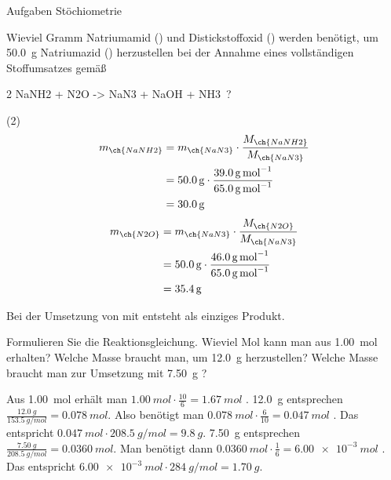 \documentclass[DIV11,bib=totoc]{scrartcl}
\begin{document}
\begin{center}
  \Huge\sffamily Aufgaben Stöchiometrie
\end{center}


\begin{question}
Wieviel Gramm Natriumamid () und Distickstoffoxid () werden
benötigt, um \SI{50.0}{g} Natriumazid () herzustellen bei der Annahme
eines vollständigen Stoffumsatzes gemäß
\begin{reaction*}
  2 NaNH2 + N2O -> NaN3 + NaOH + NH3 \,?
\end{reaction*}
\end{question}
\begin{solution}
\begin{tasks}[label=\empty](2)
  \task
  \begin{align*}
    m_{\ch{NaNH2}} &= m_{\ch{NaN3}} \cdot\frac{M_{\ch{NaNH2}}}{M_{\ch{NaN3}}} \\
      &= \SI{50.0}{g}\cdot\frac{\SI{39.0}{\gram\per\mole}}{\SI{65.0}{\gram\per\mole}} \\
      &= \SI{30.0}{g}
  \end{align*}
  \task
  \begin{align*}
    m_{\ch{N2O}} &= m_{\ch{NaN3}} \cdot\frac{M_{\ch{N2O}}}{M_{\ch{NaN3}}} \\
      &= \SI{50.0}{g}\cdot\frac{\SI{46.0}{\gram\per\mole}}{\SI{65.0}{\gram\per\mole}} \\
      &= \SI{35.4}{g}
  \end{align*}
\end{tasks}
\end{solution}

\begin{question}
Bei der Umsetzung von  mit  entsteht  als
einziges Produkt.
\begin{tasks}
  \task Formulieren Sie die Reaktionsgleichung.
  \task Wieviel Mol  kann man aus \SI{1.00}{mol}  erhalten?
  \task Welche Masse  braucht man, um \SI{12.0}{g} 
    herzustellen?
  \task Welche Masse  braucht man zur Umsetzung mit \SI{7.50}{g}
    ?
\end{tasks}
\end{question}
\begin{solution}
  \begin{tasks}
    \task {}
    \task Aus \SI{1.00}{mol}  erhält man
      $\SI{1.00}{mol}\cdot\frac{10}{6} = \SI{1.67}{mol}$ .
    \task \SI{12.0}{g}  entsprechen
      $\frac{\SI{12.0}{g}}{\SI{153.5}{g/mol}} = \SI{0.078}{mol}$.  Also
      benötigt man $\SI{0.078}{mol}\cdot\frac{6}{10}=\SI{0.047}{mol}$
      .  Das entspricht $\SI{0.047}{mol}\cdot\SI{208.5}{g/mol} =
      \SI{9.8}{g}$.
    \task \SI{7.50}{g}  entsprechen
      $\frac{\SI{7.50}{g}}{\SI{208.5}{g/mol}} = \SI{0.0360}{mol}$.  Man
      benötigt dann $\SI{0.0360}{mol}\cdot\frac{1}{6}=\SI{6.00e-3}{mol}$
      .  Das entspricht $\SI{6.00e-3}{mol}\cdot\SI{284}{g/mol} =
      \SI{1.70}{g}$.
  \end{tasks}
\end{solution}
\end{document}
